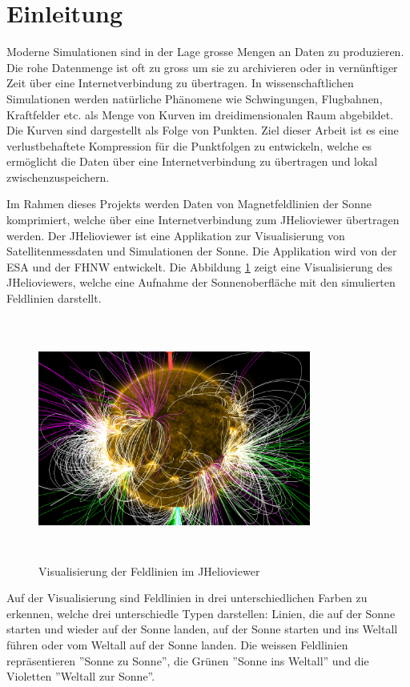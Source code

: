 \section{Einleitung}\label{einleitung}
Moderne Simulationen sind in der Lage grosse Mengen an Daten zu produzieren. Die rohe Datenmenge ist oft zu gross um sie zu archivieren oder in vernünftiger Zeit über eine Internetverbindung zu übertragen. In wissenschaftlichen Simulationen werden natürliche Phänomene wie Schwingungen, Flugbahnen, Kraftfelder etc. als Menge von Kurven im dreidimensionalen Raum abgebildet. Die Kurven sind dargestellt als Folge von Punkten. Ziel dieser Arbeit ist es eine verlustbehaftete Kompression für die Punktfolgen zu entwickeln, welche es ermöglicht die Daten über eine Internetverbindung zu übertragen und lokal zwischenzuspeichern.

Im Rahmen dieses Projekts werden Daten von Magnetfeldlinien der Sonne komprimiert, welche über eine Internetverbindung zum JHelioviewer übertragen werden. Der JHelioviewer ist eine Applikation zur Visualisierung von Satellitenmessdaten und Simulationen der Sonne. Die Applikation wird von der ESA und der FHNW entwickelt. Die Abbildung \ref{einleitung::feldlinien} zeigt eine Visualisierung des JHelioviewers, welche eine Aufnahme der Sonnenoberfläche mit den simulierten Feldlinien darstellt.

\begin{figure}[!htbp]
\center
	\includegraphics[width=0.8\textwidth,height=8cm,keepaspectratio]{./pictures/einleitung/fieldLines.png}
	\caption{Visualisierung der Feldlinien im JHelioviewer}
	\label{einleitung::feldlinien}
\end{figure}
Auf der Visualisierung sind Feldlinien in drei unterschiedlichen Farben zu erkennen, welche drei unterschiedle Typen darstellen: Linien, die auf der Sonne starten und wieder auf der Sonne landen, auf der Sonne starten und ins Weltall führen oder vom Weltall auf der Sonne landen. Die weissen Feldlinien repräsentieren ''Sonne zu Sonne'', die Grünen ''Sonne ins Weltall'' und die Violetten ''Weltall zur Sonne''.

